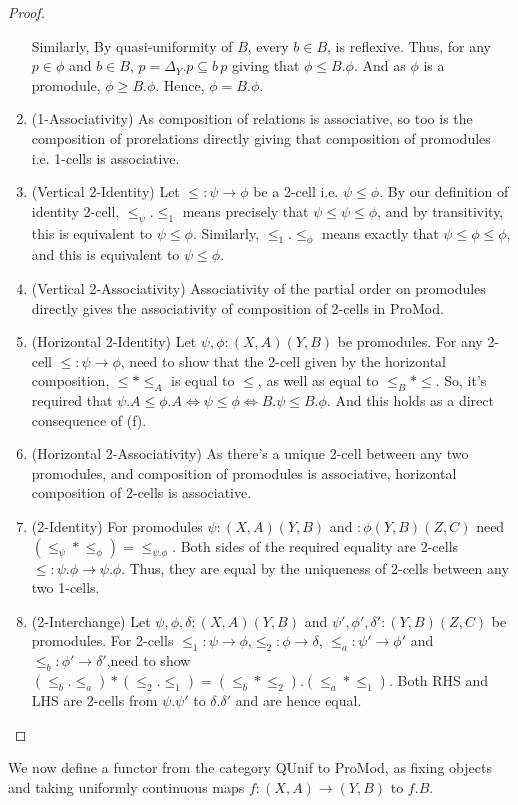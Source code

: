 \documentclass[18pt,a4paper]{article}
\makeatletter
\theoremstyle{definition}
\newcommand{\carrow}{}%
\DeclareRobustCommand{\carrow}{%
	\mathrel{\vphantom{\rightarrow}\mathpalette\circle@arrow\relax}%
}
\newcommand{\circle@arrow}[2]{%
	\m@th
	\ooalign{%
		\hidewidth$#1\circ\mkern1mu$\hidewidth\cr
	$#1\longrightarrow$\cr}%
}
\makeatother
\begin{document}
\begin{proof}
\begin{enumerate}[label=(\alph*)]
			Similarly, By quasi-uniformity of $B$, every $b \in B$, is
			reflexive. Thus, for any $p \in \phi$ and $b\in B$, $p=\Delta_Y.p\subseteq
			b\,p$ giving that $\phi \leq B.\phi$. And as $\phi$ is a promodule,
			$\phi \geq B.\phi$. Hence, $\phi=B.\phi$.
		\item (1-Associativity) As composition of relations is associative, so too is the
			composition of prorelations directly giving that composition of promodules
			i.e. 1-cells is associative.
		\item (Vertical 2-Identity) Let $\leq:\psi \to \phi$ be a 2-cell i.e.
			$\psi \leq \phi$. By our definition of identity 2-cell, $\leq_\psi.\leq_1$
			means precisely that $\psi \leq \psi \leq \phi $, and by transitivity,
			this is equivalent to $\psi \leq \phi$.
			Similarly, $\leq_1.\leq_\phi$ means exactly that $\psi
			\leq \phi \leq \phi $, and this is equivalent to $\psi \leq \phi$.
		\item (Vertical 2-Associativity) Associativity of the partial order on promodules
			directly gives the associativity of composition of 2-cells in ProMod.
		\item (Horizontal 2-Identity) Let $\psi,\phi: (X,A)\carrow (Y,B)$ be promodules.
			For any 2-cell $\leq:\psi \to \phi $, need to show that the 2-cell given
			by the horizontal composition, $\leq*\leq_A$ is equal to $\leq$, as well as
			equal to $\leq_B *\leq$. So, it's required that $\psi.A \leq \phi.A
			\iff \psi \leq \phi \iff B.\psi \leq B.\phi$. And this holds as a
			direct consequence of (f).
		\item (Horizontal 2-Associativity) As there's a unique 2-cell between any two
			promodules, and composition of promodules is associative,
			horizontal composition of 2-cells is associative.
		\item (2-Identity) For promodules $\psi:(X,A)\carrow (Y,B)$ and
			$:\phi(Y,B) \carrow (Z,C)$ need $(\leq_\psi * \leq_\phi)=\leq_{\psi.\phi}$.
			Both sides of the required equality are 2-cells $\leq:\psi.\phi
			\to \psi.\phi$.	Thus, they are equal by the uniqueness of 2-cells between
			any two 1-cells.
		\item (2-Interchange) Let $\psi,\phi,\delta:(X,A) \carrow (Y,B)$ and
			$\psi',\phi',\delta':(Y,B) \carrow (Z,C)$ be promodules. For
			2-cells $\leq_1:\psi \to \phi $,$\leq_2:\phi \to \delta $,
			$\leq_a:\psi' \to \phi' $ and $\leq_b:\phi' \to \delta'$,need to show
			$(\leq_b.\leq_a)*(\leq_2.\leq_1)=(\leq_b*\leq_2).(\leq_a*\leq_1)$.
			Both RHS and LHS are 2-cells from $\psi.\psi'$ to $\delta.\delta'$ and are
			hence equal. \qedhere
	\end{enumerate}
\end{proof}
We now define a functor from the category QUnif to ProMod, as fixing objects and taking uniformly
continuous maps $f:(X,A)\to(Y,B)$ to $f.B$.
\end{document}
